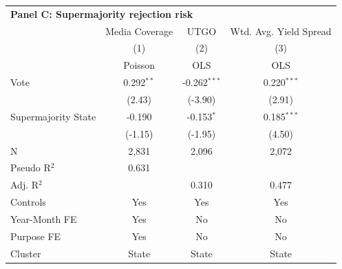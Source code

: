 \begingroup
\centering
\begin{tabular*}{\textwidth}{@{\extracolsep{\fill}}lccc}
\multicolumn{4}{l}{\textbf{Panel C: Supermajority rejection risk}}\\
\addlinespace
   \toprule
                       & Media Coverage & UTGO           & Wtd. Avg. Yield Spread\\
                       & (1)            & (2)            & (3)\\
                       &  Poisson       & OLS            & OLS\\
   \midrule
   Vote                & 0.292$^{**}$   & -0.262$^{***}$ & 0.220$^{***}$\\
                       & (2.43)        & (-3.90)       & (2.91)\\
   Supermajority State & -0.190         & -0.153$^{*}$   & 0.185$^{***}$\\
                       & (-1.15)       & (-1.95)       & (4.50)\\
   \hline
   N        & 2,831          & 2,096          & 2,072\\
   Pseudo R$^2$               & 0.631 &  & \\
   Adj. R$^2$                 &  & 0.310 & 0.477\\
   Controls                   & Yes & Yes & Yes\\
   Year-Month FE       & Yes            & No             & No\\
   Purpose FE          & Yes            & No             & No\\
   Cluster              & State & State & State\\
   \bottomrule
\end{tabular*}
\par\endgroup
